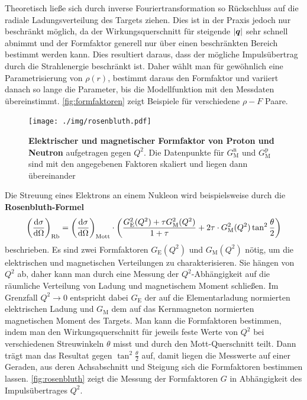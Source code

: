 Theoretisch ließe sich durch inverse Fouriertransformation so Rückschluss auf die radiale Ladungsverteilung des Targets ziehen.
Dies ist in der Praxis jedoch nur beschränkt möglich, da der Wirkungsquerschnitt für steigende $|\mvec{q}|$ sehr schnell abnimmt und der Formfaktor generell nur über einen beschränkten Bereich bestimmt werden kann.
Dies resultiert daraus, dass der mögliche Impulsübertrag durch die Strahlenergie beschränkt ist.
Daher wählt man für gewöhnlich eine Parametrisierung von $\rho(r)$, bestimmt daraus den Formfaktor und variiert danach so lange die Parameter, bis die Modellfunktion mit den Messdaten übereinstimmt.
\autoref{fig:formfaktoren} zeigt Beispiele für verschiedene $\rho-F$ Paare.

\begin{figure}
	\centering
	\texttt{[image: ./img/rosenbluth.pdf]}
	\caption[Elektrischer und magnetischer Formfaktor von Proton und Neutron]{\textbf{Elektrischer und magnetischer Formfaktor von Proton und Neutron} aufgetragen gegen $Q^2$. Die Datenpunkte für $G_\text{M}^\text{n}$ und $G_\text{M}^\text{p}$ sind mit den angegebenen Faktoren skaliert und liegen dann übereinander}
	\label{fig:rosenbluth}
\end{figure}
Die Streuung eines Elektrons an einem Nukleon wird beispielsweise durch die \textbf{Rosenbluth-Formel}
\begin{equation*}
	\left(\diff[\sigma]{\Omega}\right)_\text{Rb} = \left(\diff[\sigma]{\Omega}\right)_\text{Mott}\cdot\left(\frac{G_\text{E}^2(Q^2) + \tau G_\text{M}^2(Q^2)}{1+\tau} + 2\tau\cdot G_\text{M}^2(Q^2)\tan^2\frac{\theta}{2}\right)
\end{equation*}
beschrieben. Es sind zwei Formfaktoren $G_\text{E}(Q^2)$ und $G_\text{M}(Q^2)$ nötig, um die elektrischen und magnetischen Verteilungen zu charakterisieren.
Sie hängen von $Q^2$ ab, daher kann man durch eine Messung der $Q^2$-Abhängigkeit auf die räumliche Verteilung von Ladung und magnetischem Moment schließen.
Im Grenzfall $Q^2\rightarrow 0$ entspricht dabei $G_\text{E}$ der auf die Elementarladung normierten elektrischen Ladung und $G_\text{M}$ dem auf das Kernmagneton normierten magnetischen Moment des Targets.
Man kann die Formfaktoren bestimmen, indem man den Wirkungsquerschnitt für jeweils feste Werte von $Q^2$ bei verschiedenen Streuwinkeln $\theta$ misst und durch den Mott-Querschnitt teilt.
Dann trägt man das Resultat gegen $\tan^2\frac{\theta}{2}$ auf, damit liegen die Messwerte auf einer Geraden, aus deren Achsabschnitt und Steigung sich die Formfaktoren bestimmen lassen.
\autoref{fig:rosenbluth} zeigt die Messung der Formfaktoren $G$ in Abhängigkeit des Impulsübertrages $Q^2$.

